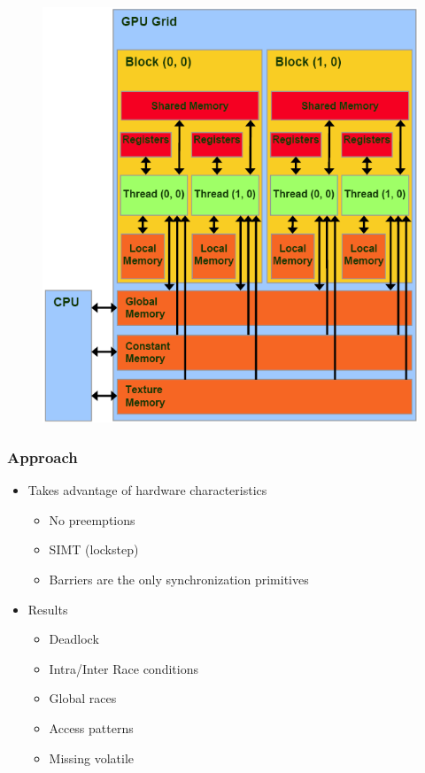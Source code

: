 \documentclass{beamer}
\begin{document}
	\begin{frame}
		\begin{figure}[htbp]
			\centering
			\includegraphics[scale=0.4]{CUDA-memory-model}
		\end{figure}
	\end{frame}
	
	\begin{frame}
		\frametitle{Approach}
		\begin{itemize}
			\item Takes advantage of hardware characteristics
			\begin{itemize}
				\item No preemptions
				\item SIMT (lockstep)
				\item Barriers are the only synchronization primitives
			\end{itemize}
			\item Results
			\begin{itemize}
				\item Deadlock
				\item Intra/Inter Race conditions
				\item Global races
				\item Access patterns
				\item Missing volatile
			\end{itemize}
		\end{itemize}
	\end{frame}
	
\end{document}
